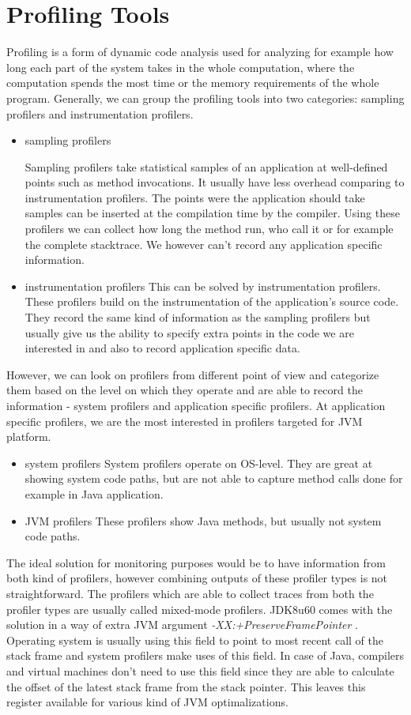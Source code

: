 \section{Profiling Tools}
Profiling is a form of dynamic code analysis used for analyzing for example how long each part of the system takes in the whole computation, where the computation spends the most time or the memory requirements of the whole program. Generally, we can group the profiling tools into two categories: sampling profilers and instrumentation profilers.

\begin{itemize}
	\item sampling profilers

Sampling profilers take statistical samples of an application at well-defined points such as method invocations. It usually have less overhead comparing to instrumentation profilers. The points were the application should take samples can be inserted at the compilation time by the compiler. Using these profilers we can collect how long the method run, who call it or for example the complete stacktrace. We however can't record any application specific information.
\item instrumentation profilers
This can be solved by instrumentation profilers. These profilers build on the instrumentation of the application's source code. They record the same kind of information as the sampling profilers but usually give us the ability to specify extra points in the code we are interested in and also to record application specific data.
\end{itemize}


However, we can look on profilers from different point of view and categorize them based on the level on which they operate and are able to record the information - system profilers and application specific profilers. 
At application specific profilers, we are the most interested in profilers targeted for JVM platform.
\begin{itemize}
	\item system profilers
	System profilers operate on OS-level. They are great at showing system code paths, but are not able to capture method calls done for example in Java application.
	\item JVM profilers
	These profilers show Java methods, but usually not system code paths.
\end{itemize}
The ideal solution for monitoring purposes would be to have information from both kind of profilers, however combining outputs of these profiler types is not straightforward. The profilers which are able to collect traces from both the profiler types are usually called mixed-mode profilers. JDK8u60 comes with the solution in a way of extra JVM argument \textit{-XX:+PreserveFramePointer} \cite{MixedModeProfilers}.  Operating system is usually using this field to point to most recent call of the stack frame and system profilers make uses of this field. In case of Java, compilers and virtual machines don't need to use this field since they are able to calculate the offset of the latest stack frame from the stack pointer. This leaves this register available for various kind of JVM optimalizations.

